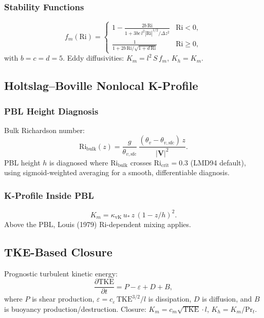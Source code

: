 \documentclass[11pt,twoside]{report}
\newcommand{\pp}{\partial}
\newcommand{\vect}[1]{\bm{#1}}
\begin{document}
\subsubsection{Stability Functions}
\begin{equation}
  f_m(\mathrm{Ri}) = \begin{cases}
    \displaystyle 1-\frac{2b\,\mathrm{Ri}}
    {1+3bc\,l^2|\mathrm{Ri}|^{1/2}/\Delta z^2} & \mathrm{Ri}<0,\\[8pt]
    \displaystyle \frac{1}{1+2b\,\mathrm{Ri}/\sqrt{1+d\,\mathrm{Ri}}}
    & \mathrm{Ri}\ge 0,
  \end{cases}
\end{equation}
with $b=c=d=5$.  Eddy diffusivities: $K_m=l^2\,S\,f_m$, $K_h=K_m$.

\subsection{Holtslag--Boville Nonlocal K-Profile}

\subsubsection{PBL Height Diagnosis}

Bulk Richardson number:
\begin{equation}
  \mathrm{Ri}_{\mathrm{bulk}}(z) = \frac{g}{\theta_{v,\mathrm{sfc}}}\,
  \frac{(\theta_v-\theta_{v,\mathrm{sfc}})\,z}{|\vect{V}|^2}.
\end{equation}
PBL height $h$ is diagnosed where $\mathrm{Ri}_{\mathrm{bulk}}$
crosses $\mathrm{Ri}_{\mathrm{crit}}=0.3$ (LMD94 default), using
sigmoid-weighted averaging for a smooth, differentiable diagnosis.

\subsubsection{K-Profile Inside PBL}
\begin{equation}
  K_m = \kappa_{\mathrm{vK}}\,u_*\,z\,(1-z/h)^2.
\end{equation}
Above the PBL, Louis (1979) Ri-dependent mixing applies.

\subsection{TKE-Based Closure}

Prognostic turbulent kinetic energy:
\begin{equation}
  \frac{\pp\mathrm{TKE}}{\pp t} = P - \varepsilon + D + B,
\end{equation}
where $P$ is shear production, $\varepsilon=c_\varepsilon\,\mathrm{TKE}^{3/2}/l$
is dissipation, $D$ is diffusion, and $B$ is buoyancy production/destruction.
Closure: $K_m = c_m\sqrt{\mathrm{TKE}}\cdot l$, $K_h = K_m/\mathrm{Pr}_t$.
\end{document}
